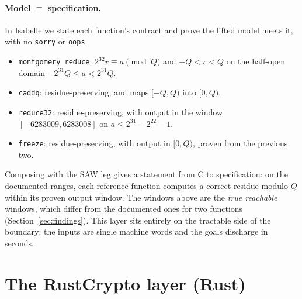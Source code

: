 \documentclass[11pt]{article}
\newcommand{\code}[1]{\texttt{#1}}
\begin{document}
\paragraph{Model $\equiv$ specification.} In Isabelle we state each function's contract and prove the
lifted model meets it, with no \code{sorry} or \code{oops}.
\begin{itemize}
  \item \code{montgomery\_reduce}: $2^{32} r \equiv a \pmod Q$ and $-Q < r < Q$ on the half-open domain
  $-2^{31} Q \le a < 2^{31} Q$.
  \item \code{caddq}: residue-preserving, and maps $[-Q, Q)$ into $[0, Q)$.
  \item \code{reduce32}: residue-preserving, with output in the window $[-6283009, 6283008]$ on
  $a \le 2^{31} - 2^{22} - 1$.
  \item \code{freeze}: residue-preserving, with output in $[0, Q)$, proven from the previous two.
\end{itemize}
Composing with the SAW leg gives a statement from C to specification: on the documented ranges, each
reference function computes a correct residue modulo $Q$ within its proven output window. The
windows above are the \emph{true reachable} windows, which differ from the documented ones for two
functions (Section~\ref{sec:findings}). This layer sits entirely on the tractable side of the boundary:
the inputs are single machine words and the goals discharge in seconds.

\section{The RustCrypto layer (Rust)}\label{sec:rust}
\end{document}
